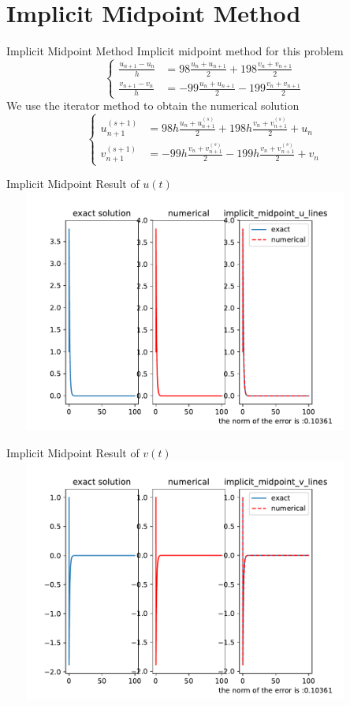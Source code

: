 \documentclass{beamer}
\begin{document}
 \section{Implicit Midpoint Method}
   \begin{frame}{Implicit Midpoint Method}
    Implicit midpoint method for this problem
    \[
        \begin{cases}
        \frac{u_{n+1}-u_n}{h} &= 98\frac{u_n+u_{n+1}}{2}+198\frac{v_n+v_{n+1}}{2}\\
        \frac{v_{n+1}-v_n}{h} &= -99\frac{u_n+u_{n+1}}{2}-199\frac{v_n+v_{n+1}}{2}
        \end{cases}
    \]
    We use the iterator method to obtain the numerical solution
    \[
        \begin{cases}
        u_{n+1}^{(s+1)} &= 98h\frac{u_n+u_{n+1}^{(s)}}{2}+198h\frac{v_n+v_{n+1}^{(s)}}{2}+u_n\\
        v_{n+1}^(s+1) &= -99h\frac{v_n+v_{n+1}^{(s)}}{2}-199h\frac{v_n+v_{n+1}^{(s)}}{2}+v_n
        \end{cases}
        \]
    \end{frame}
 \begin{frame}{Implicit Midpoint Result of $u(t)$}
    \centering
    \includegraphics[height=8cm,width=12cm]{implicit_midpoint_u_lines.pdf}
 \end{frame}
 \begin{frame}{Implicit Midpoint Result of $v(t)$}
    \centering
    \includegraphics[height=8cm,width=12cm]{implicit_midpoint_v_lines.pdf}
 \end{frame}
 
\end{document}
